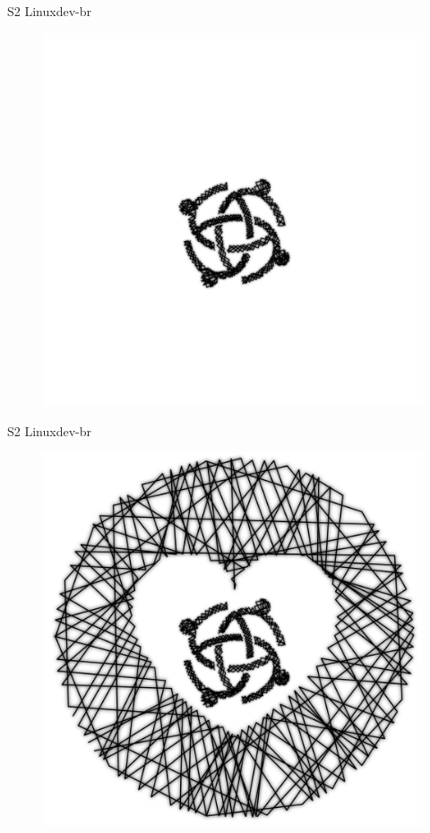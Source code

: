 \documentclass[10pt, compress, aspectratio=169]{beamer}
\begin{document}
\begin{frame}{S2 Linuxdev-br}
  \begin{figure}
    \centering
    \includegraphics[width=\linewidth,
                     height=0.8\textheight,
                     keepaspectratio]{linuxdev-br}
  \end{figure}
\end{frame}

\begin{frame}{S2 Linuxdev-br}
  \begin{figure}
    \centering
    \includegraphics[width=\linewidth,
                     height=0.8\textheight,
                     keepaspectratio]{love_linuxdev-br}
  \end{figure}
\end{frame}
\end{document}
